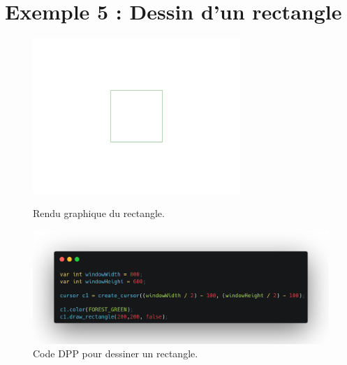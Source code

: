 \documentclass[12pt,a4paper]{report}
\begin{document}
\section{Exemple 5 : Dessin d'un rectangle}
\begin{figure}[H]
    \centering
    \includegraphics[width=0.7\textwidth]{assets/render/draw_rectangle.png}
    \caption{Rendu graphique du rectangle.}
    \includegraphics[width=1\textwidth]{assets/code/draw_rectangle_dpp.png}
    \caption{Code DPP pour dessiner un rectangle.}
\end{figure}
\end{document}
